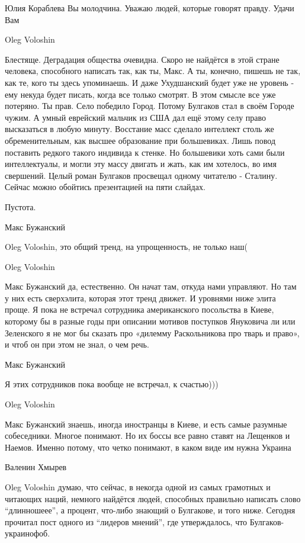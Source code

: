 Юлия Кораблева
Вы молодчина. Уважаю людей, которые говорят правду. Удачи Вам

Oleg Voloshin

Блестяще. Деградация общества очевидна. Скоро не найдётся в этой стране
человека, способного написать так, как ты, Макс. А ты, конечно, пишешь не так,
как те, кого ты здесь упоминаешь. И даже Ухудшанский будет уже не уровень - ему
некуда будет писать, когда все только смотрят. В этом смысле все уже потеряно.
Ты прав. Село победило Город. Потому Булгаков стал в своём Городе чужим. А
умный еврейский мальчик из США дал ещё этому селу право высказаться в любую
минуту. Восстание масс сделало интеллект столь же обременительным, как высшее
образование при большевиках. Лишь повод поставить редкого такого индивида к
стенке. Но большевики хоть сами были интеллектуалы, и могли эту массу двигать и
жать, как им хотелось, во имя свершений. Целый роман Булгаков просвещал одному
читателю - Сталину. Сейчас можно обойтись презентацией на пяти слайдах.

Пустота.

Макс Бужанский

Oleg Voloshin, это общий тренд, на упрощенность, не только наш(

Oleg Voloshin

Макс Бужанский да, естественно. Он начат там, откуда нами управляют. Но там у
них есть сверхэлита, которая этот тренд движет. И уровнями ниже элита проще. Я
пока не встречал сотрудника американского посольства в Киеве, которому бы в
разные годы при описании мотивов поступков Януковича ли или Зеленского я не мог
бы сказать про «дилемму Раскольникова про тварь и право», и чтоб он при этом не
знал, о чем речь.

Макс Бужанский

Я этих сотрудников пока вообще не встречал, к счастью)))

Oleg Voloshin

Макс Бужанский знаешь, иногда иностранцы в Киеве, и есть самые разумные
собеседники. Многое понимают. Но их боссы все равно ставят на Лещенков и
Наемов. Именно потому, что четко понимают, в каком виде им нужна Украина

Валенин Хмырев

Oleg Voloshin думаю, что сейчас, в некогда одной из самых грамотных и читающих
наций, немного найдётся людей, способных правильно написать слово \enquote{длинношеее}, а
процент, что-либо знающий о Булгакове, и того ниже. Сегодня прочитал пост одного
из \enquote{лидеров мнений}, где утверждалось, что Булгаков-украинофоб.

